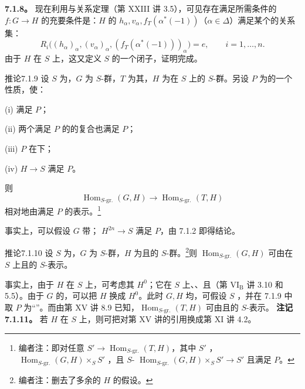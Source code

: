 \textbf{7.1.8。} 现在利用与关系定理（第 XXIII 讲 3.5），可见存在满足所需条件的 $f:G\to H$ 的充要条件是：$H$ 的 $h_\alpha,v_\alpha,f_T(\alpha^*(-1))$（$\alpha\in\Delta$）满足某个的关系集：
\[R_i\bigl((h_\alpha)_\alpha,(v_\alpha)_\alpha,(f_T(\alpha^*(-1)))_\alpha\bigr)=e,\qquad i=1,\ldots,n.\]
由于 $H$ 在 $S$ 上，这又定义 $S$ 的一个闭子，证明完成。
\begin{SGAresult}{推论}{7.1.9}
设 $S$ 为，$G$ 为 $S$-群，$T$ 为其，$H$ 为在 $S$ 上的 $S$-群。另设 $P$ 为的一个性质，使：

(i) 满足 $P$；

(ii) 两个满足 $P$ 的的复合也满足 $P$；

(iii) $P$ 在下；

(iv)  $H\to S$ 满足 $P$。

则
\[\operatorname{Hom}_{S\text{-gr.}}(G,H)\longrightarrow\operatorname{Hom}_{S\text{-gr.}}(T,H)\]
相对地由满足 $P$ 的表示。\footnote{编者注：即对任意 $S'\to\operatorname{Hom}_{S\text{-gr.}}(T,H)$，其中 $S'$ ，$\operatorname{Hom}_{S\text{-gr.}}(G,H)\times_SS'$ ，且 $S$- $\operatorname{Hom}_{S\text{-gr.}}(G,H)\times_SS'\to S'$ 且满足 $P$。}
\end{SGAresult}
事实上，可以假设 $G$ 带； $H^{2n}\to S$ 满足 $P$，由 7.1.2 即得结论。
\begin{SGAresult}{推论}{7.1.10}
设 $S$ 为，$G$ 为 $S$-群，$H$ 为且的 $S$-群。\footnote{编者注：删去了多余的 $H$ 的假设。}则 $\operatorname{Hom}_{S\text{-gr.}}(G,H)$ 可由在 $S$ 上且的 $S$-表示。
\end{SGAresult}
事实上，由于 $H$ 在 $S$ 上，可考虑其 $H^0$；它在 $S$ 上、、且（第 VI$_{\mathrm B}$ 讲 3.10 和 5.5）。由于 $G$ 的，可以把 $H$ 换成 $H^0$。此时 $G,H$ 均，可假设 $S$ ，并在 7.1.9 中取 $P$ 为“”。而由第 XV 讲 8.9 已知，$\operatorname{Hom}_{S\text{-gr.}}(T,H)$ 可由且的 $S$-表示。
\textbf{注记 7.1.11。} 若 $H$ 在 $S$ 上，则可把对第 XV 讲的引用换成第 XI 讲 4.2。

